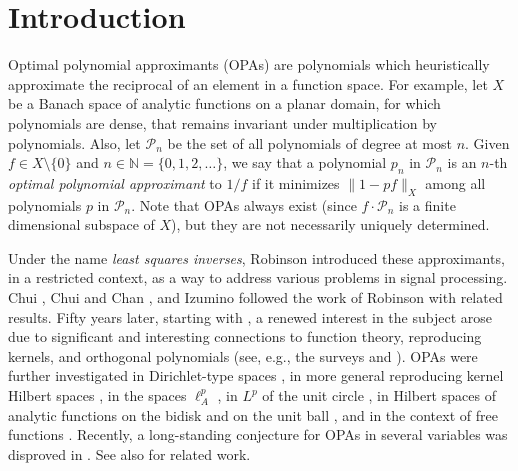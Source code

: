 \documentclass{article}
\theoremstyle{plain}
\numberwithin{Theorem}{section}
\numberwithin{equation}{section}
\theoremstyle{plain}
\theoremstyle{definition}
\newcommand{\N}{\mathbb{N}}
\begin{document}
\section{Introduction}\label{intro}
Optimal polynomial approximants (OPAs) are polynomials which heuristically approximate the reciprocal of an element in a function space. For example, let $X$ be a Banach space of analytic functions on a planar domain, for which polynomials are dense, that remains invariant under multiplication by polynomials. Also, let $\mathcal{P}_n$ be the set of all polynomials of degree at most $n$. Given $f \in X \setminus\{0\}$ and $n \in \N = \{0, 1, 2, \ldots\}$, we say that a polynomial $p_n$ in $\mathcal{P}_n$ is an $n$-th \textit{optimal polynomial approximant} to $1/f$ if it minimizes $\|1 - p f \|_X$ among all polynomials $p$ in $\mathcal{P}_n$. Note that OPAs always exist (since $f\cdot\mathcal{P}_n$ is a finite dimensional subspace of $X$), but they are not necessarily uniquely determined.




Under the name \textit{least squares inverses}, Robinson \cite{Ro} introduced these approximants, in a restricted context, as a way to address various problems in signal processing. Chui \cite{Chu1}, Chui and Chan \cite{ChuCha}, and Izumino \cite{Iz} followed the work of Robinson with related results. Fifty years later, starting with \cite{BCLSS1}, a renewed interest in the subject arose due to significant and interesting connections to function theory, reproducing kernels, and orthogonal polynomials (see, e.g., the surveys \cite{BC} and \cite{Sec}). OPAs were further investigated in Dirichlet-type spaces \cite{BFKSS,BKLSS}, in
more general reproducing kernel Hilbert spaces  
\cite{FMS}, in 
the spaces $\ell^p_A$ \cite{CRSX,ST}, in 
$L^p$ of the unit circle  \cite{Cent}, in 
Hilbert spaces of analytic 
functions on the bidisk  
\cite{BCLSS2,BKKLSS} and on the unit ball
\cite{SS2,SS1}, and in the context of free functions \cite{AAJS}. Recently, a long-standing conjecture for OPAs in several variables was disproved in \cite{BKS_Sh}. See also \cite{AS, BIMS, BMS, Felder, Felder2} for related work. 
\end{document}
